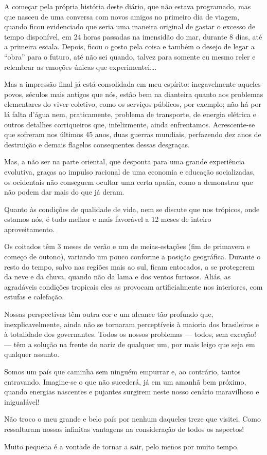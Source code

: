 A começar pela própria história deste diário, que não estava programado, mas que nasceu de uma conversa com novos amigos no primeiro dia de viagem, quando ficou evidenciado que seria uma maneira original de gastar o excesso de tempo disponível, em 24 horas passadas na imensidão do mar, durante 8 dias, até a primeira escala. Depois, ficou o gosto pela coisa e também o desejo de legar a ``obra'' para o futuro, até não sei quando, talvez para somente eu mesmo reler e relembrar as emoções únicas que experimentei\ldots.

Mas a impressão final já está consolidada em meu espírito: inegavelmente aqueles povos, séculos mais antigos que nós, estão bem na dianteira quanto aos problemas elementares do viver coletivo, como os serviços públicos, por exemplo; não há por lá falta d’água nem, praticamente, problema de transporte, de energia elétrica e outros detalhes corriqueiros que, infelizmente, ainda enfrentamos. Acrescente-se que sofreram nos últimos 45 anos, duas guerras mundiais, perfazendo dez anos de destruição e demais flagelos consequentes dessas desgraças.

Mas, a não ser na parte oriental, que desponta para uma grande experiência evolutiva, graças ao impulso racional de uma economia e educação socializadas, os ocidentais não conseguem ocultar uma certa apatia, como a demonstrar que não podem dar mais do que já deram.

Quanto às condições de qualidade de vida, nem se discute que nos trópicos, onde estamos nós, é tudo melhor e mais favorável a 12 meses de inteiro aproveitamento.

Os coitados têm 3 meses de verão e um de meias-estações (fim de primavera e começo de outono), variando um pouco conforme a posição geográfica. Durante o resto do tempo, salvo nas regiões mais ao sul, ficam entocados, a se protegerem da neve e da chuva, quando não da lama e dos ventos furiosos. Aliás, as agradáveis condições tropicais eles as provocam artificialmente nos interiores, com estufas e calefação.

Nossas perspectivas têm outra cor e um alcance tão profundo que, inexplicavelmente, ainda não se tornaram perceptíveis à maioria dos brasileiros e à totalidade dos governantes. Todos os nossos problemas --- todos, sem exceção! --- têm a solução na frente do nariz de qualquer um, por mais leigo que seja em qualquer assunto.

Somos um país que caminha sem ninguém empurrar e, ao contrário, tantos entravando. Imagine-se o que não sucederá, já em um amanhã bem próximo, quando energias nascentes e pujantes surgirem neste nosso cenário maravilhoso e inigualável!

Não troco o meu grande e belo país por nenhum daqueles treze que visitei. Como ressaltaram nossas infinitas vantagens na consideração de todos os aspectos!

Muito pequena é a vontade de tornar a sair, pelo menos por muito tempo.
